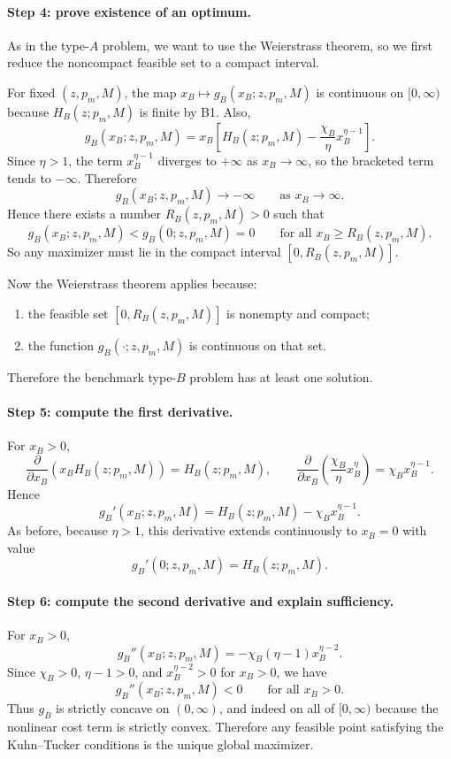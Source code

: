 \paragraph{Step 4: prove existence of an optimum.}
As in the type-$A$ problem, we want to use the Weierstrass theorem, so we first reduce the noncompact feasible set to a compact interval.

For fixed $(z,p_m,M)$, the map $x_B\mapsto g_B(x_B;z,p_m,M)$ is continuous on $[0,\infty)$ because $H_B(z;p_m,M)$ is finite by B1. Also,
\[
g_B(x_B;z,p_m,M)
=
x_B\left[H_B(z;p_m,M)-\frac{\chi_B}{\eta}x_B^{\eta-1}\right].
\]
Since $\eta>1$, the term $x_B^{\eta-1}$ diverges to $+\infty$ as $x_B\to\infty$, so the bracketed term tends to $-\infty$. Therefore
\[
g_B(x_B;z,p_m,M)\to -\infty
\qquad\text{as }x_B\to\infty.
\]
Hence there exists a number $R_B(z,p_m,M)>0$ such that
\[
g_B(x_B;z,p_m,M)<g_B(0;z,p_m,M)=0
\qquad\text{for all }x_B\ge R_B(z,p_m,M).
\]
So any maximizer must lie in the compact interval $[0,R_B(z,p_m,M)]$.

Now the Weierstrass theorem applies because:
\begin{enumerate}
    \item the feasible set $[0,R_B(z,p_m,M)]$ is nonempty and compact;
    \item the function $g_B(\cdot;z,p_m,M)$ is continuous on that set.
\end{enumerate}
Therefore the benchmark type-$B$ problem has at least one solution.

\paragraph{Step 5: compute the first derivative.}
For $x_B>0$,
\[
\frac{\partial}{\partial x_B}\left(x_BH_B(z;p_m,M)\right)=H_B(z;p_m,M),
\qquad
\frac{\partial}{\partial x_B}\left(\frac{\chi_B}{\eta}x_B^\eta\right)=\chi_B x_B^{\eta-1}.
\]
Hence
\begin{equation}
g_B'(x_B;z,p_m,M)=H_B(z;p_m,M)-\chi_B x_B^{\eta-1}.
\label{eq:p2B_derivative_rev}
\end{equation}
As before, because $\eta>1$, this derivative extends continuously to $x_B=0$ with value
\[
g_B'(0;z,p_m,M)=H_B(z;p_m,M).
\]

\paragraph{Step 6: compute the second derivative and explain sufficiency.}
For $x_B>0$,
\begin{equation}
g_B''(x_B;z,p_m,M)=-\chi_B(\eta-1)x_B^{\eta-2}.
\label{eq:p2B_second_derivative_rev}
\end{equation}
Since $\chi_B>0$, $\eta-1>0$, and $x_B^{\eta-2}>0$ for $x_B>0$, we have
\[
g_B''(x_B;z,p_m,M)<0
\qquad\text{for all }x_B>0.
\]
Thus $g_B$ is strictly concave on $(0,\infty)$, and indeed on all of $[0,\infty)$ because the nonlinear cost term is strictly convex. Therefore any feasible point satisfying the Kuhn--Tucker conditions is the unique global maximizer.

